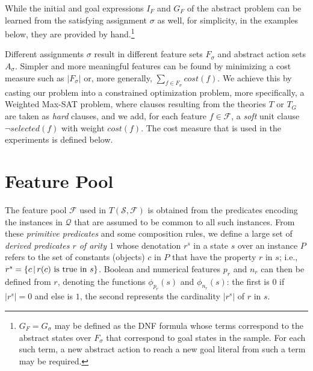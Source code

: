 \documentclass[letterpaper]{article} %
\newcommand{\Omit}[1]{}
\newtheorem{theorem}[definition]{Theorem}
\newcommand{\Q}{\mathcal{Q}}
\newcommand{\F}{\mathcal{F}}
\renewcommand{\S}{\mathcal{S}}
\begin{document}
While the initial and goal expressions $I_F$ and $G_F$ of the abstract problem can be learned 
from the satisfying assignment $\sigma$ as well, for simplicity, in the examples below, they are
provided by hand.\footnote{$G_F = G_{\sigma}$ may be defined as the DNF formula whose terms 
  correspond to the abstract states over $F_{\sigma}$ that correspond to goal states in
  the sample. For each such term, a new abstract action to reach a new goal literal
  from such a term may be required.
  }



\Omit{
Due to  \eqref{eq:d1} and \eqref{eq:goal} that force the selected features in $F_{\sigma}$
to   distinguish goal  from non-goal states, we have that:

\begin{theorem}
For a satisfying assignment $\sigma$  of $T(\S,\F)$, 
$s$ is expanded goal   state in $\S$  iff  $s$ satisfies  $G_F=G_{\sigma}$.
\end{theorem}
}
% 

Different assignments $\sigma$ result in different feature sets $F_{\sigma}$
and abstract action sets $A_{\sigma}$. Simpler and more meaningful features can be found 
by minimizing a cost measure such as $|F_{\sigma}|$
or, more generally, $\sum_{f \in F_{\sigma}} cost(f)$.
We achieve this by casting our problem
into a constrained optimization problem, more specifically, a Weighted Max-SAT problem,
where clauses resulting from the theories $T$ or $T_G$ are taken as \emph{hard} clauses,
and we add, for each feature $f \in \F$, a
\emph{soft} unit clause $\neg selected(f)$ with weight $cost(f)$.
The cost measure that is used in the experiments is defined below.


\section{Feature Pool}

The feature pool $\F$ used in $T(\S,\F)$ is obtained 
from the   predicates encoding  the instances in $\Q$
that are assumed to be common to all such instances.
From these \emph{primitive predicates} and some composition rules,
we define a large set of \emph{derived predicates $r$ of arity $1$}
whose denotation $r^s$ in a state $s$ over an instance $P$
refers to the set of constants (objects) $c$ in $P$ that
have the property $r$ in $s$; i.e., $r^s=\{c \, | \, r(c) \hbox{ is true in $s$}\}$.
Boolean and numerical features $p_r$ and $n_r$ can then be defined from  $r$,
denoting the functions $\phi_{p_r}(s)$ and $\phi_{n_r}(s)$: the first is $0$
if $|r^s|=0$ and else is $1$, the second represents the cardinality $|r^s|$ of $r$ in $s$.
\end{document}
